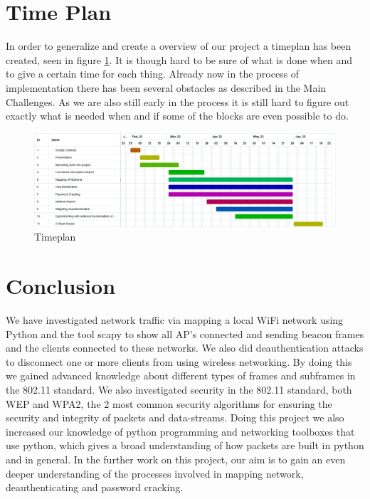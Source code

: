 \section{Time Plan}
In order to generalize and create a overview of our project a timeplan has been created, seen in figure \ref{timeplan}. It is though hard to be sure of what is done when and to give a certain time for each thing. Already now in the process of implementation there has been several obstacles as described in the Main Challenges.  As we are also still early in the process it is still hard to figure out exactly what is needed when and if some of the blocks are even possible to do. 
\\
\begin{figure}[!htbp]
    \centering
    \includegraphics[width=1\textwidth]{Latex-Files/Billeder/Timeplan.png}
    \caption{Timeplan}
    \label{timeplan}
\end{figure}


\section{Conclusion}

We have investigated network traffic via mapping a local WiFi network using Python and the tool scapy to show all AP's connected and sending beacon frames and the clients connected to these networks. We also did deauthentication attacks to disconnect one or more clients from using wireless networking. By doing this we gained advanced knowledge about different types of frames and subframes in the 802.11 standard. We also investigated security in the 802.11 standard, both WEP and WPA2, the 2 most common security algorithms for ensuring the security and integrity of packets and data-streams. Doing this project we also increased our knowledge of python programming and networking toolboxes that use python, which gives a broad understanding of how packets are built in python and in general. 
In the further work on this project, our aim is to gain an even deeper understanding of the processes involved in mapping network, deauthenticating and password cracking. 

